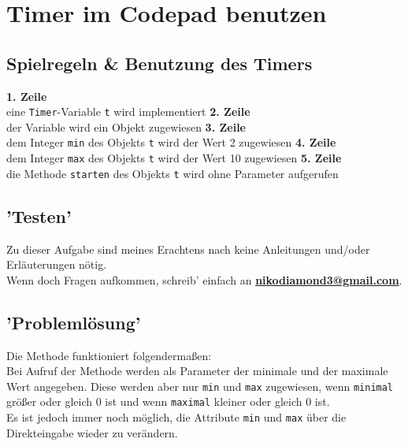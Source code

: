 \documentclass{scrartcl}   %
\begin{document}
\cleardoublepage

\section{Timer im Codepad benutzen}

\subsection{Spielregeln \& Benutzung des Timers}

\begin{itemize}
    \barrow \textbf{1. Zeile}\\
    eine \texttt{Timer}-Variable \texttt{t} wird implementiert
    \barrow \textbf{2. Zeile}\\
    der Variable wird ein Objekt zugewiesen
    \barrow \textbf{3. Zeile}\\
    dem Integer \texttt{min} des Objekts \texttt{t} wird der Wert 2 zugewiesen
    \barrow \textbf{4. Zeile}\\
    dem Integer \texttt{max} des Objekts \texttt{t} wird der Wert 10 zugewiesen
    \barrow \textbf{5. Zeile}\\
    die Methode \texttt{starten} des Objekts \texttt{t} wird ohne Parameter aufgerufen
\end{itemize}

\subsection{'Testen'}

Zu dieser Aufgabe sind meines Erachtens nach keine Anleitungen und/oder Erläuterungen nötig.\\
Wenn doch Fragen aufkommen, schreib' einfach an \textbf{\href{mailto:nikodiamond3@gmail.com}{nikodiamond3@gmail.com}}.

\subsection{'Problemlösung'}

Die Methode funktioniert folgendermaßen:\\
Bei Aufruf der Methode werden als Parameter der minimale und der maximale Wert angegeben. Diese werden aber nur \texttt{min} und \texttt{max} zugewiesen, wenn \texttt{minimal} größer oder gleich 0 ist und wenn \texttt{maximal} kleiner oder gleich 0 ist.\\
Es ist jedoch immer noch möglich, die Attribute \texttt{min} und \texttt{max} über die Direkteingabe wieder zu verändern.
\end{document}
